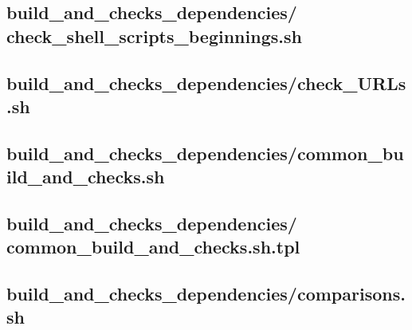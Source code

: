\documentclass{article}
\begin{document}


\subsection{
  build\_and\_checks\_dependencies/%
check\_shell\_scripts\_beginnings.sh
}
\label{
  build_and_checks_dependencies:check_shell_scripts_beginningssh
}



\subsection{
  build\_and\_checks\_dependencies/check\_URLs.sh
}
\label{
  build_and_checks_dependencies:check_URLssh
}



\subsection{
  build\_and\_checks\_dependencies/common\_build\_and\_checks.sh
}
\label{
  build_and_checks_dependencies:common_build_and_checkssh
}



\subsection{
  build\_and\_checks\_dependencies/%
common\_build\_and\_checks.sh.tpl
}
\label{
  build_and_checks_dependencies:common_build_and_checksshtpl
}



\subsection{
  build\_and\_checks\_dependencies/comparisons.sh
}
\label{
  build_and_checks_dependencies:comparisonssh
}

\end{document}
